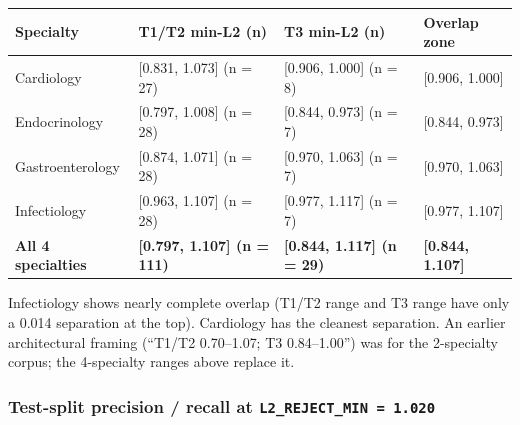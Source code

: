 \documentclass[
  american,
  a4paper,
]{article}
\begin{document}
\begin{longtable}[]{@{}
  >{\raggedright\arraybackslash}p{}
  >{\raggedright\arraybackslash}p{}
  >{\raggedright\arraybackslash}p{}
  >{\raggedright\arraybackslash}p{}@{}}
\toprule\noalign{}
\begin{minipage}[b]{\linewidth}\raggedright
Specialty
\end{minipage} & \begin{minipage}[b]{\linewidth}\raggedright
T1/T2 min-L2 (n)
\end{minipage} & \begin{minipage}[b]{\linewidth}\raggedright
T3 min-L2 (n)
\end{minipage} & \begin{minipage}[b]{\linewidth}\raggedright
Overlap zone
\end{minipage} \\
\midrule\noalign{}
\endhead
\bottomrule\noalign{}
\endlastfoot
Cardiology & {[}0.831, 1.073{]} (n = 27) & {[}0.906, 1.000{]} (n = 8) &
{[}0.906, 1.000{]} \\
Endocrinology & {[}0.797, 1.008{]} (n = 28) & {[}0.844, 0.973{]} (n = 7)
& {[}0.844, 0.973{]} \\
Gastroenterology & {[}0.874, 1.071{]} (n = 28) & {[}0.970, 1.063{]} (n =
7) & {[}0.970, 1.063{]} \\
Infectiology & {[}0.963, 1.107{]} (n = 28) & {[}0.977, 1.117{]} (n = 7)
& {[}0.977, 1.107{]} \\
\textbf{All 4 specialties} & \textbf{{[}0.797, 1.107{]} (n = 111)} &
\textbf{{[}0.844, 1.117{]} (n = 29)} & \textbf{{[}0.844, 1.107{]}} \\
\end{longtable}

Infectiology shows nearly complete overlap (T1/T2 range and T3 range
have only a 0.014 separation at the top). Cardiology has the cleanest
separation. An earlier architectural framing (``T1/T2 0.70--1.07; T3
0.84--1.00'') was for the 2-specialty corpus; the 4-specialty ranges
above replace it.

\subsubsection{\texorpdfstring{Test-split precision / recall at
\texttt{L2\_REJECT\_MIN\ =\ 1.020}}{Test-split precision / recall at L2\_REJECT\_MIN = 1.020}}\label{test-split-precision-recall-at-l2_reject_min-1.020}
\end{document}
